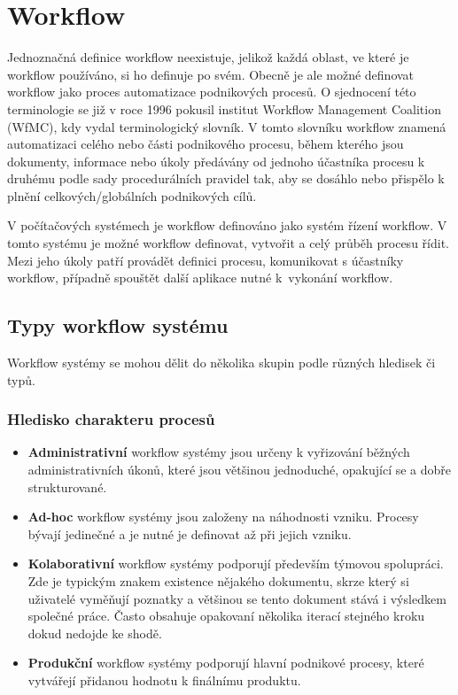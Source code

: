 \documentclass{fithesis}
\begin{document}
\chapter{Workflow}
Jednoznačná definice workflow neexistuje, jelikož každá oblast, ve které je workflow používáno, si ho definuje po svém. Obecně je ale možné definovat workflow jako proces automatizace podnikových procesů. O sjednocení této terminologie se již v roce 1996 pokusil institut Workflow Management Coalition (WfMC), kdy vydal terminologický slovník. V tomto slovníku workflow znamená automatizaci celého nebo části podnikového procesu, během kterého jsou dokumenty, informace nebo úkoly předávány od jednoho účastníka procesu k druhému podle sady procedurálních pravidel tak, aby se dosáhlo nebo přispělo k plnění celkových/globálních podnikových cílů. \cite{wfmc}

V počítačových systémech je workflow definováno jako systém řízení workflow. V tomto systému je možné workflow definovat, vytvořit a celý průběh procesu řídit. Mezi jeho úkoly patří provádět definici procesu, komunikovat s účastníky workflow, případně spouštět další aplikace nutné k~vykonání workflow.


\section{Typy workflow systému}
Workflow systémy se mohou dělit do několika skupin podle různých hledisek či typů. \cite{workflow}

\subsection*{Hledisko charakteru procesů}
\begin{itemize}
\item \textbf{Administrativní} workflow systémy jsou určeny k vyřizování běžných administrativních úkonů, které jsou většinou jednoduché, opakující se a dobře strukturované.
\item \textbf{Ad-hoc} workflow systémy jsou založeny na náhodnosti vzniku. Procesy bývají jedinečné a je nutné je definovat až při jejich vzniku.
\item \textbf{Kolaborativní} workflow systémy podporují především týmovou spolupráci. Zde je typickým znakem existence nějakého dokumentu, skrze který si uživatelé vyměňují poznatky a většinou se tento dokument stává i výsledkem společné práce. Často obsahuje opakovaní několika iterací stejného kroku dokud nedojde ke shodě.
\item \textbf{Produkční} workflow systémy podporují hlavní podnikové procesy, které vytvářejí přidanou hodnotu k finálnímu produktu.
\end{itemize}
\end{document}
